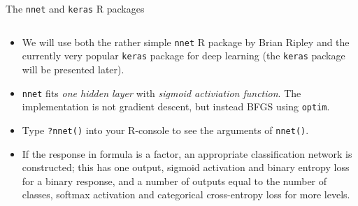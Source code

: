 \documentclass[10pt,ignorenonframetext,]{beamer}
\begin{document}
\begin{frame}[fragile]

\begin{block}{The \texttt{nnet} and \texttt{keras} R packages}

\(~\)

\begin{itemize}
\item
  We will use both the rather simple \texttt{nnet} R package by Brian
  Ripley and the currently very popular \texttt{keras} package for deep
  learning (the \texttt{keras} package will be presented later).
  \vspace{2mm}
\item
  \texttt{nnet} fits \emph{one hidden layer} with \emph{sigmoid
  activiation function}. The implementation is not gradient descent, but
  instead BFGS using \texttt{optim}. \vspace{2mm}
\end{itemize}

\begin{itemize}
\item
  Type \texttt{?nnet()} into your R-console to see the arguments of
  \texttt{nnet()}. \vspace{2mm}
\item
  If the response in formula is a factor, an appropriate classification
  network is constructed; this has one output, sigmoid activation and
  binary entropy loss for a binary response, and a number of outputs
  equal to the number of classes, softmax activation and categorical
  cross-entropy loss for more levels.
\end{itemize}

\end{block}

\end{frame}
\end{document}

